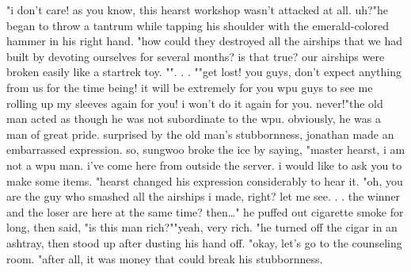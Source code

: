 "i don't care! as you know, this hearst workshop wasn't attacked at all.
 uh?"he began to throw a tantrum while tapping his shoulder with the emerald-colored hammer in his right hand.
"how could they destroyed all the airships that we had built by devoting ourselves for several months? is that true? our airships were broken easily like a startrek toy.
"".
.
.
""get lost! you guys, don't expect anything from us for the time being! it will be extremely for you wpu guys to see me rolling up my sleeves again for you! i won't do it again for you.
 never!"the old man acted as though he was not subordinate to the wpu.
 obviously, he was a man of great pride.
surprised by the old man's stubbornness, jonathan made an embarrassed expression.
so, sungwoo broke the ice by saying, "master hearst, i am not a wpu man.
 i've come here from outside the server.
 i would like to ask you to make some items.
"hearst changed his expression considerably to hear it.
"oh, you are the guy who smashed all the airships i made, right? let me see.
.
.
the winner and the loser are here at the same time? then…" he puffed out cigarette smoke for long, then said, "is this man rich?""yeah, very rich.
"he turned off the cigar in an ashtray, then stood up after dusting his hand off.
"okay, let's go to the counseling room.
"after all, it was money that could break his stubbornness.


 